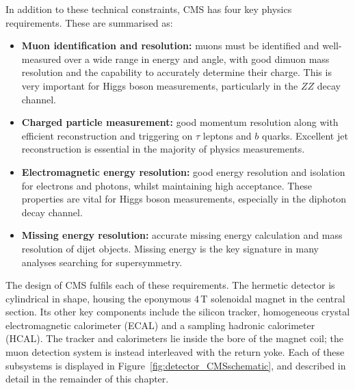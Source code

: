 In addition to these technical constraints, CMS has four key physics requirements.
These are summarised as:
\begin{itemize}
  \item{\textbf{Muon identification and resolution:}
  muons must be identified and well-measured over a wide range in energy and angle, 
  with good dimuon mass resolution and the capability to accurately determine their charge.
  This is very important for Higgs boson measurements, particularly in the $ZZ$ decay channel.}
  \item{\textbf{Charged particle measurement:}
  good momentum resolution along with efficient reconstruction and triggering on $\tau$ leptons and $b$ quarks.
  Excellent jet reconstruction is essential in the majority of physics measurements.}
  \item{\textbf{Electromagnetic energy resolution:}
  good energy resolution and isolation for electrons and photons, whilst maintaining high acceptance.
  These properties are vital for Higgs boson measurements, especially in the diphoton decay channel.}
  \item{\textbf{Missing energy resolution:}
  accurate missing energy calculation and mass resolution of dijet objects.
  Missing energy is the key signature in many analyses searching for supersymmetry.}
\end{itemize}

The design of CMS fulfils each of these requirements.
The hermetic detector is cylindrical in shape, 
housing the eponymous 4\,T solenoidal magnet in the central section.
Its other key components include the silicon tracker, 
homogeneous crystal electromagnetic calorimeter (ECAL) and a sampling hadronic calorimeter (HCAL).
The tracker and calorimeters lie inside the bore of the magnet coil; 
the muon detection system is instead interleaved with the return yoke.
Each of these subsystems is displayed in Figure~\ref{fig:detector_CMSschematic}, 
and described in detail in the remainder of this chapter.


